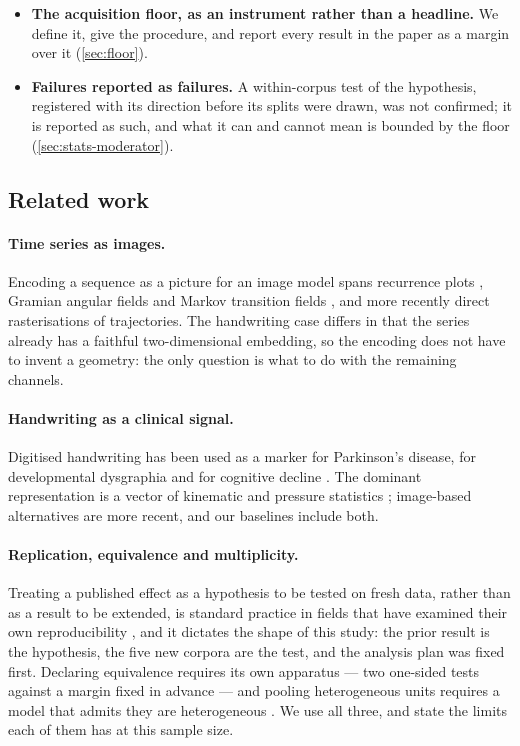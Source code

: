 \begin{itemize}
\item \textbf{The acquisition floor, as an instrument rather than a headline.} We define it, give
the procedure, and report every result in the paper as a margin over it (\cref{sec:floor}).

\item \textbf{Failures reported as failures.} A within-corpus test of the hypothesis, registered
with its direction before its splits were drawn, was not confirmed; it is reported as such, and
what it can and cannot mean is bounded by the floor (\cref{sec:stats-moderator}).
\end{itemize}

\subsection{Related work}
\label{sec:related}

\paragraph{Time series as images.} Encoding a sequence as a picture for an image model spans
recurrence plots \citep{eckmann1987recurrence}, Gramian angular fields and Markov transition fields
\citep{wang2015gaf}, and more recently direct rasterisations of trajectories. The handwriting case
differs in that the series already has a faithful two-dimensional embedding, so the encoding does
not have to invent a geometry: the only question is what to do with the remaining channels.

\paragraph{Handwriting as a clinical signal.} Digitised handwriting has been used as a marker for
Parkinson's disease, for developmental dysgraphia and for cognitive decline
\citep{werner2006handwriting}. The dominant representation is a vector of kinematic and pressure
statistics \citep{drotar2016pahaw,drotar2020dysgraphia}; image-based alternatives are more recent,
and our baselines include both.

\paragraph{Replication, equivalence and multiplicity.} Treating a published effect as a hypothesis
to be tested on fresh data, rather than as a result to be extended, is standard practice in fields
that have examined their own reproducibility \citep{osc2015}, and it dictates the shape of this
study: the prior result is the hypothesis, the five new corpora are the test, and the analysis plan
was fixed first. Declaring equivalence requires its own apparatus --- two one-sided tests against a
margin fixed in advance \citep{schuirmann1987,lakens2018equivalence} --- and pooling heterogeneous
units requires a model that admits they are heterogeneous
\citep{higgins2002,hartung2001,viechtbauer2005}. We use all three, and state the limits each of
them has at this sample size.

